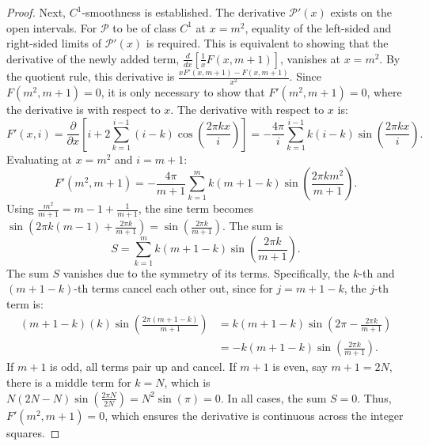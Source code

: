 \documentclass[11pt,a4paper]{amsart}
\newcommand{\Px}{\mathcal{P}}
\theoremstyle{plain}
\theoremstyle{definition}
\begin{document}
\begin{proof}
Next, $C^1$-smoothness is established. The derivative $\Px'(x)$ exists on the open intervals. For $\Px$ to be of class $C^1$ at $x=m^2$, equality of the left-sided and right-sided limits of $\Px'(x)$ is required. This is equivalent to showing that the derivative of the newly added term, $\frac{d}{dx}\left[\frac{1}{x}F(x, m+1)\right]$, vanishes at $x=m^2$.
By the quotient rule, this derivative is $\frac{x F'(x, m+1) - F(x, m+1)}{x^2}$. Since $F(m^2, m+1)=0$, it is only necessary to show that $F'(m^2, m+1)=0$, where the derivative is with respect to $x$.
The derivative with respect to $x$ is:
\[ F'(x, i) = \frac{\partial}{\partial x}\left[i+2\sum_{k=1}^{i-1}(i-k)\cos\left(\frac{2\pi k x}{i}\right)\right] = -\frac{4\pi}{i}\sum_{k=1}^{i-1}k(i-k)\sin\left(\frac{2\pi k x}{i}\right). \]
Evaluating at $x=m^2$ and $i=m+1$:
\[ F'(m^2, m+1) = -\frac{4\pi}{m+1}\sum_{k=1}^{m}k(m+1-k)\sin\left(\frac{2\pi k m^2}{m+1}\right). \]
Using $\frac{m^2}{m+1} = m-1 + \frac{1}{m+1}$, the sine term becomes $\sin\left(2\pi k(m-1) + \frac{2\pi k}{m+1}\right) = \sin\left(\frac{2\pi k}{m+1}\right)$. The sum is
\[ S = \sum_{k=1}^{m}k(m+1-k)\sin\left(\frac{2\pi k}{m+1}\right). \]
The sum $S$ vanishes due to the symmetry of its terms. Specifically, the $k$-th and $(m+1-k)$-th terms cancel each other out, since for $j=m+1-k$, the $j$-th term is:
\begin{align*}
(m+1-k)(k)\sin\left(\frac{2\pi (m+1-k)}{m+1}\right) &= k(m+1-k)\sin\left(2\pi - \frac{2\pi k}{m+1}\right) \\
&= -k(m+1-k)\sin\left(\frac{2\pi k}{m+1}\right).
\end{align*}
If $m+1$ is odd, all terms pair up and cancel. If $m+1$ is even, say $m+1=2N$, there is a middle term for $k=N$, which is $N(2N-N)\sin\left(\frac{2\pi N}{2N}\right) = N^2\sin(\pi) = 0$. In all cases, the sum $S=0$.
Thus, $F'(m^2, m+1) = 0$, which ensures the derivative is continuous across the integer squares.
\end{proof}
\end{document}

